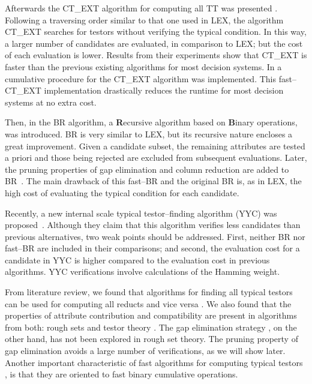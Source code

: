 \documentclass[number,preprint,review,12pt]{elsarticle}
\begin{document}
  Afterwards the CT\_EXT algorithm for computing all TT was presented \cite{Sanchez07}. Following a traversing order similar to that one used in LEX, the algorithm CT\_EXT searches for testors without verifying the typical condition. In this way, a larger number of candidates are evaluated, in comparison to LEX; but the cost of each evaluation is lower. Results from their experiments show that CT\_EXT is faster than the previous existing algorithms for most decision systems. In \cite{Sanchez10} a cumulative procedure for the CT\_EXT algorithm was implemented. This fast--CT\_EXT implementation drastically reduces the runtime for most decision systems at no extra cost.
  
  Then, in \cite{Lias09} the BR algorithm, a \textbf{R}ecursive algorithm based on \textbf{B}inary operations, was introduced. BR is very similar to LEX, but its recursive nature encloses a great improvement. Given a candidate subset, the remaining attributes are tested a priori and those being rejected are excluded from subsequent evaluations. Later, the pruning properties of gap elimination and column reduction are added to BR~\citep{Lias13}. The main drawback of this fast--BR and the original BR is, as in LEX, the high cost of evaluating the typical condition for each candidate.
  
  Recently, a new internal scale typical testor--finding algorithm (YYC) was proposed~\cite{Alba14}. Although they claim that this algorithm verifies less candidates than previous alternatives, two weak points should be addressed. First, neither BR nor fast--BR are included in their comparisons; and second, the evaluation cost for a candidate in YYC is higher compared to the evaluation cost in previous algorithms. YYC verifications involve calculations of the Hamming weight.
  
  From literature review, we found that algorithms for finding all typical testors can be used for computing all reducts and vice versa \citep{Lazo15}. We also found that the properties of attribute contribution and compatibility are present in algorithms from both: rough sets \citep{WangP07} and testor theory \citep{Sanchez10,Lias13}. The gap elimination strategy \citep{Santiesteban03,Lias13}, on the other hand, has not been explored in rough set theory. The pruning property of gap elimination avoids a large number of verifications, as we will show later. Another important characteristic of fast algorithms for computing typical testors \citep{Sanchez10,Lias13}, is that they are oriented to fast binary cumulative operations. 
  
\end{document}
